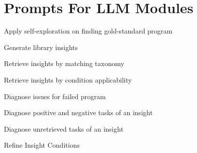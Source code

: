 \documentclass[sigconf, nonacm]{acmart}
\newcommand{\promptboxfromfile}[2]{%
  \begin{promptbox}{#1}
    
  \end{promptbox}%
}
\begin{document}
\FloatBarrier
\onecolumn
\section{Prompts For LLM Modules\label{appendix:prompts}}

\promptboxfromfile{Apply self-exploration on finding gold-standard program}{prompts/Self_Explore.txt}

\promptboxfromfile{Generate library insights}{prompts/Generate_insights.txt}

\promptboxfromfile{Retrieve insights by matching taxonomy}{prompts/Retri_Label.txt}

\promptboxfromfile{Retrieve insights by condition applicability}{prompts/Retri_Condition.txt}

\promptboxfromfile{Diagnose issues for failed program}{prompts/Diagnose_Issues.txt}

\promptboxfromfile{Diagnose positive and negative tasks of an insight}{prompts/Diagnose_Pos_Neg.txt}

\promptboxfromfile{Diagnose unretrieved tasks of an insight}{prompts/Diagnose_Unretri.txt}

\promptboxfromfile{Refine Insight Conditions}{prompts/Ins_Refinement.txt}
\end{document}
